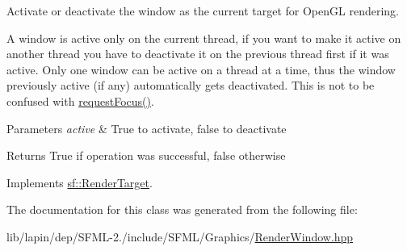 Activate or deactivate the window as the current target for Open\-G\-L rendering. 

A window is active only on the current thread, if you want to make it active on another thread you have to deactivate it on the previous thread first if it was active. Only one window can be active on a thread at a time, thus the window previously active (if any) automatically gets deactivated. This is not to be confused with \hyperlink{classsf_1_1_window_a58cf7fa1775e8e7542032e3ecfa83b49}{request\-Focus()}.


\begin{DoxyParams}{Parameters}
{\em active} & True to activate, false to deactivate\\
\hline
\end{DoxyParams}
\begin{DoxyReturn}{Returns}
True if operation was successful, false otherwise 
\end{DoxyReturn}


Implements \hyperlink{classsf_1_1_render_target_a4438c5885b142d070a769a7a868b0fdc}{sf\-::\-Render\-Target}.



The documentation for this class was generated from the following file\-:\begin{DoxyCompactItemize}
\item 
lib/lapin/dep/\-S\-F\-M\-L-\/2./include/\-S\-F\-M\-L/\-Graphics/\hyperlink{lapin_2dep_2_s_f_m_l-2_83_2include_2_s_f_m_l_2_graphics_2_render_window_8hpp}{Render\-Window.\-hpp}\end{DoxyCompactItemize}
